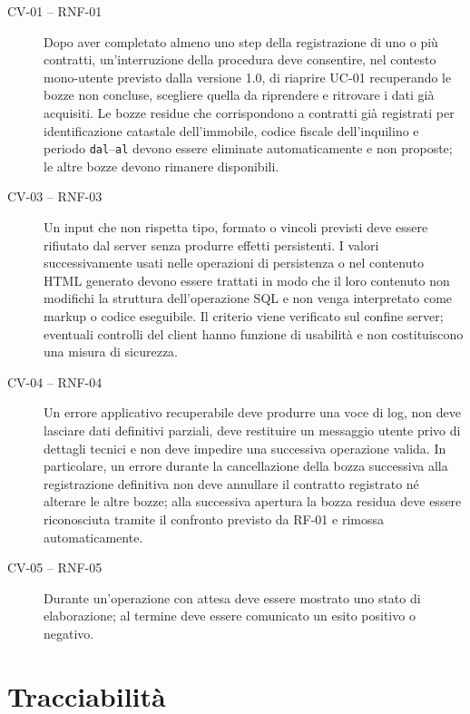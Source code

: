 \documentclass[12pt,a4paper]{article}
\begin{document}
\begin{description}
    \item[CV-01 -- RNF-01] Dopo aver completato almeno uno step della registrazione di uno o più
    contratti, un'interruzione della procedura deve consentire, nel contesto mono-utente previsto
    dalla versione 1.0, di riaprire UC-01 recuperando le bozze non concluse, scegliere quella da
    riprendere e ritrovare i dati già acquisiti. Le bozze residue che corrispondono a contratti già
    registrati per identificazione catastale dell'immobile, codice fiscale dell'inquilino e periodo
    \texttt{dal}--\texttt{al} devono essere eliminate automaticamente e non proposte; le altre
    bozze devono rimanere disponibili.

    \item[CV-03 -- RNF-03] Un input che non rispetta tipo, formato o vincoli previsti deve
    essere rifiutato dal server senza produrre effetti persistenti. I valori successivamente usati
    nelle operazioni di persistenza o nel contenuto HTML generato devono essere trattati in modo che
    il loro contenuto non modifichi la struttura dell'operazione SQL e non venga interpretato come
    markup o codice eseguibile. Il criterio viene verificato sul confine server; eventuali controlli
    del client hanno funzione di usabilità e non costituiscono una misura di sicurezza.

    \item[CV-04 -- RNF-04] Un errore applicativo recuperabile deve produrre una voce di
    log, non deve lasciare dati definitivi parziali, deve restituire un messaggio utente privo di
    dettagli tecnici e non deve impedire una successiva operazione valida. In particolare, un errore
    durante la cancellazione della bozza successiva alla registrazione definitiva non deve annullare
    il contratto registrato né alterare le altre bozze; alla successiva apertura la bozza residua deve
    essere riconosciuta tramite il confronto previsto da RF-01 e rimossa automaticamente.

    \item[CV-05 -- RNF-05] Durante un'operazione con attesa deve essere mostrato uno stato
    di elaborazione; al termine deve essere comunicato un esito positivo o negativo.
\end{description}

\section{Tracciabilità}
\end{document}
